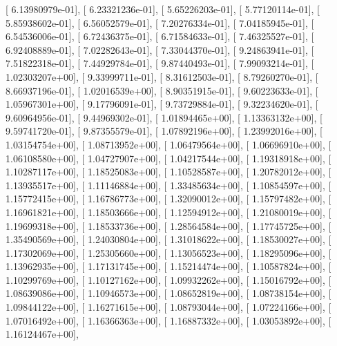 \documentclass{article}
\begin{document}
       [  6.13980979e-01],
       [  6.23321236e-01],
       [  5.65226203e-01],
       [  5.77120114e-01],
       [  5.85938602e-01],
       [  6.56052579e-01],
       [  7.20276334e-01],
       [  7.04185945e-01],
       [  6.54536006e-01],
       [  6.72436375e-01],
       [  6.71584633e-01],
       [  7.46325527e-01],
       [  6.92408889e-01],
       [  7.02282643e-01],
       [  7.33044370e-01],
       [  9.24863941e-01],
       [  7.51822318e-01],
       [  7.44929784e-01],
       [  9.87440493e-01],
       [  7.99093214e-01],
       [  1.02303207e+00],
       [  9.33999711e-01],
       [  8.31612503e-01],
       [  8.79260270e-01],
       [  8.66937196e-01],
       [  1.02016539e+00],
       [  8.90351915e-01],
       [  9.60223633e-01],
       [  1.05967301e+00],
       [  9.17796091e-01],
       [  9.73729884e-01],
       [  9.32234620e-01],
       [  9.60964956e-01],
       [  9.44969302e-01],
       [  1.01894465e+00],
       [  1.13363132e+00],
       [  9.59741720e-01],
       [  9.87355579e-01],
       [  1.07892196e+00],
       [  1.23992016e+00],
       [  1.03154754e+00],
       [  1.08713952e+00],
       [  1.06479564e+00],
       [  1.06696910e+00],
       [  1.06108580e+00],
       [  1.04727907e+00],
       [  1.04217544e+00],
       [  1.19318918e+00],
       [  1.10287117e+00],
       [  1.18525083e+00],
       [  1.10528587e+00],
       [  1.20782012e+00],
       [  1.13935517e+00],
       [  1.11146884e+00],
       [  1.33485634e+00],
       [  1.10854597e+00],
       [  1.15772415e+00],
       [  1.16786773e+00],
       [  1.32090012e+00],
       [  1.15797482e+00],
       [  1.16961821e+00],
       [  1.18503666e+00],
       [  1.12594912e+00],
       [  1.21080019e+00],
       [  1.19699318e+00],
       [  1.18533736e+00],
       [  1.28564584e+00],
       [  1.17745725e+00],
       [  1.35490569e+00],
       [  1.24030804e+00],
       [  1.31018622e+00],
       [  1.18530027e+00],
       [  1.17302069e+00],
       [  1.25305660e+00],
       [  1.13056523e+00],
       [  1.18295096e+00],
       [  1.13962935e+00],
       [  1.17131745e+00],
       [  1.15214474e+00],
       [  1.10587824e+00],
       [  1.10299769e+00],
       [  1.10127162e+00],
       [  1.09932262e+00],
       [  1.15016792e+00],
       [  1.08639086e+00],
       [  1.10946573e+00],
       [  1.08652819e+00],
       [  1.08738154e+00],
       [  1.09844122e+00],
       [  1.16271615e+00],
       [  1.08793044e+00],
       [  1.07224166e+00],
       [  1.07016492e+00],
       [  1.16366363e+00],
       [  1.16887332e+00],
       [  1.03053892e+00],
       [  1.16124467e+00],
\end{document}
